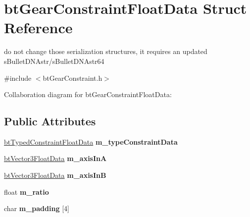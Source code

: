 \hypertarget{structbt_gear_constraint_float_data}{\section{bt\+Gear\+Constraint\+Float\+Data Struct Reference}
\label{structbt_gear_constraint_float_data}
}


do not change those serialization structures, it requires an updated s\+Bullet\+D\+N\+Astr/s\+Bullet\+D\+N\+Astr64  




{\ttfamily \#include $<$bt\+Gear\+Constraint.\+h$>$}



Collaboration diagram for bt\+Gear\+Constraint\+Float\+Data\+:
\subsection*{Public Attributes}
\begin{DoxyCompactItemize}
\item 
\hypertarget{structbt_gear_constraint_float_data_a7491b3955f465f6fcb08b848ce19a978}{\hyperlink{structbt_typed_constraint_float_data}{bt\+Typed\+Constraint\+Float\+Data} {\bfseries m\+\_\+type\+Constraint\+Data}}\label{structbt_gear_constraint_float_data_a7491b3955f465f6fcb08b848ce19a978}

\item 
\hypertarget{structbt_gear_constraint_float_data_acc2733b90a74a35cde262be6f4413c2f}{\hyperlink{structbt_vector3_float_data}{bt\+Vector3\+Float\+Data} {\bfseries m\+\_\+axis\+In\+A}}\label{structbt_gear_constraint_float_data_acc2733b90a74a35cde262be6f4413c2f}

\item 
\hypertarget{structbt_gear_constraint_float_data_a93c72df31cfec37292123bfbed2b412e}{\hyperlink{structbt_vector3_float_data}{bt\+Vector3\+Float\+Data} {\bfseries m\+\_\+axis\+In\+B}}\label{structbt_gear_constraint_float_data_a93c72df31cfec37292123bfbed2b412e}

\item 
\hypertarget{structbt_gear_constraint_float_data_a9d9a8927435e2ae3f8342f98d514ece2}{float {\bfseries m\+\_\+ratio}}\label{structbt_gear_constraint_float_data_a9d9a8927435e2ae3f8342f98d514ece2}

\item 
\hypertarget{structbt_gear_constraint_float_data_abff0a100d046be0f9ca058827228ddb0}{char {\bfseries m\+\_\+padding} \mbox{[}4\mbox{]}}\label{structbt_gear_constraint_float_data_abff0a100d046be0f9ca058827228ddb0}

\end{DoxyCompactItemize}


